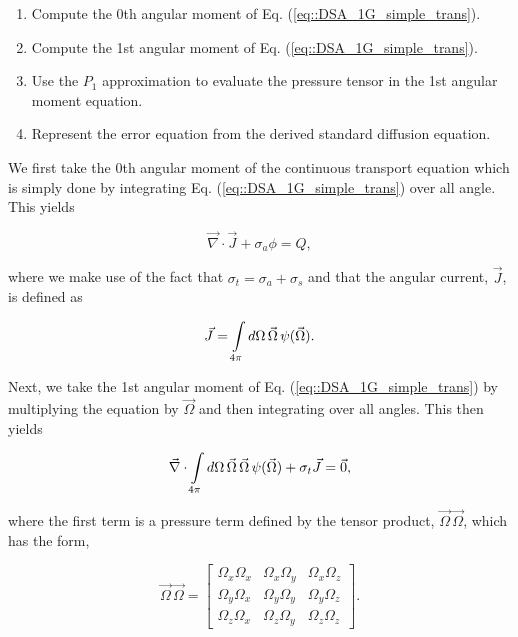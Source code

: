 \begin{enumerate}
\item Compute the 0th angular moment of Eq. (\ref{eq::DSA_1G_simple_trans}).
\item Compute the 1st angular moment of Eq. (\ref{eq::DSA_1G_simple_trans}).
\item Use the $P_1$ approximation to evaluate the pressure tensor in the 1st angular moment equation.
\item Represent the error equation from the derived standard diffusion equation.
\end{enumerate}

We first take the 0th angular moment of the continuous transport equation which is simply done by integrating Eq. (\ref{eq::DSA_1G_simple_trans}) over all angle. This yields

\begin{equation}
\label{eq::DSA_1G_0mom}
\vec{\nabla} \cdot \vec{J} + \sigma_a \phi =  Q,
\end{equation}

\noindent where we make use of the fact that $\sigma_t = \sigma_a + \sigma_s $ and that the angular current, $\vec{J}$, is defined as

\begin{equation}
\label{eq::DSA_1G_current}
\vec{J} = \int\displaylimits_{4 \pi}  d \Omega \, \vec{\Omega}\, \psi (\vec{\Omega})   .
\end{equation}

\noindent Next, we take the 1st angular moment of Eq. (\ref{eq::DSA_1G_simple_trans}) by multiplying the equation by $\vec{\Omega}$ and then integrating over all angles. This then yields 

\begin{equation}
\label{eq::DSA_1G_1mom}
\vec{\nabla} \cdot  \int\displaylimits_{4 \pi}  d \Omega \, \vec{\Omega}\, \vec{\Omega} \, \psi (\vec{\Omega}) + \sigma_t \vec{J} = \vec{0},
\end{equation}

\noindent where the first term is a pressure term defined by the tensor product, $ \vec{\Omega} \, \vec{\Omega}$, which has the form,

\begin{equation}
\label{eq::DSA_1G_TP}
\vec{\Omega}\, \vec{\Omega}  =    \left[
\begin{array}{ccc}
\Omega_x \Omega_x & \Omega_x \Omega_y & \Omega_x \Omega_z \\
\Omega_y \Omega_x & \Omega_y \Omega_y & \Omega_y \Omega_z \\
\Omega_z \Omega_x & \Omega_z \Omega_y & \Omega_z \Omega_z 
\end{array}
\right] .
\end{equation}

